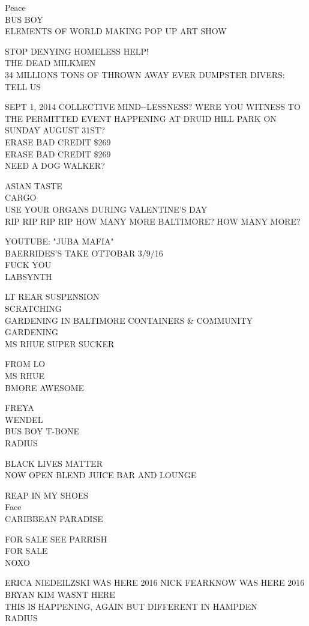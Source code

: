 \documentclass[10pt,letterpaper]{article}
\begin{document}
Peace\\
BUS BOY\\
ELEMENTS OF WORLD MAKING POP UP ART SHOW

STOP DENYING HOMELESS HELP!\\
THE DEAD MILKMEN\\
34 MILLIONS TONS OF THROWN AWAY EVER DUMPSTER DIVERS: TELL US

SEPT 1, 2014 COLLECTIVE MIND{-}{-}LESSNESS?  WERE YOU WITNESS TO THE PERMITTED EVENT HAPPENING AT DRUID HILL PARK ON SUNDAY AUGUST 31ST?\\
ERASE BAD CREDIT \$269\\
ERASE BAD CREDIT \$269\\
NEED A DOG WALKER?

ASIAN TASTE\\
CARGO\\
USE YOUR ORGANS DURING VALENTINE'S DAY\\
RIP RIP RIP RIP HOW MANY MORE BALTIMORE?  HOW MANY MORE?

YOUTUBE: "JUBA MAFIA"\\
BAERRIDES'S TAKE OTTOBAR 3/9/16\\
FUCK YOU\\
LABSYNTH

LT REAR SUSPENSION\\
SCRATCHING\\
GARDENING IN BALTIMORE CONTAINERS \& COMMUNITY GARDENING\\
MS RHUE SUPER SUCKER

FROM LO\\
MS RHUE\\
BMORE AWESOME

FREYA\\
WENDEL\\
BUS BOY T{-}BONE\\
RADIUS

BLACK LIVES MATTER\\
NOW OPEN BLEND JUICE BAR AND LOUNGE

REAP IN MY SHOES\\
Face\\
CARIBBEAN PARADISE

FOR SALE SEE PARRISH\\
FOR SALE\\
NOXO

ERICA NIEDEILZSKI WAS HERE 2016 NICK FEARKNOW WAS HERE 2016 BRYAN KIM WASNT HERE\\
THIS IS HAPPENING, AGAIN BUT DIFFERENT IN HAMPDEN\\
RADIUS
\end{document}

